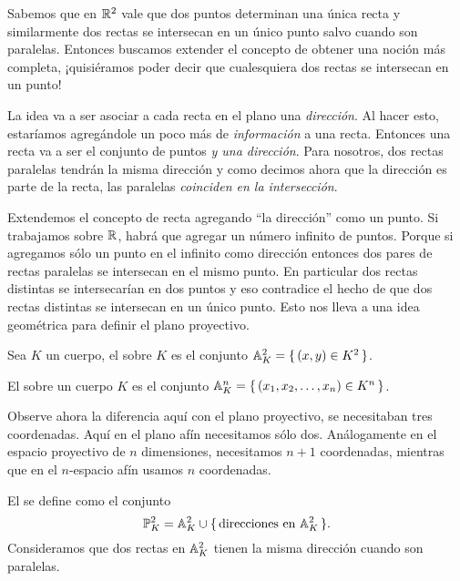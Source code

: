 \documentclass[12pt]{memoir}
\begin{document}
Sabemos que en $\mathbb{R}^2$ vale que dos puntos determinan una única recta y similarmente dos rectas se intersecan en un único punto salvo cuando son paralelas. Entonces buscamos extender el concepto de obtener una noción más completa, ¡quisiéramos poder decir que cualesquiera dos rectas se intersecan en un punto!\par 
La idea va a ser asociar a cada recta en el plano una \emph{dirección}. Al hacer esto, estaríamos agregándole un poco más de \emph{información} a una recta. Entonces una recta va a ser el conjunto de puntos \emph{y una dirección}. Para nosotros, dos rectas paralelas tendrán la misma dirección y como decimos ahora que la dirección es parte de la recta, las paralelas \emph{coinciden en la intersección}.\par 
Extendemos el concepto de recta agregando ``la dirección'' como un punto. Si trabajamos sobre $\mathbb{R}$, habrá que agregar un número infinito de puntos. Porque si agregamos sólo un punto en el infinito como dirección entonces dos pares de rectas paralelas se intersecan en el mismo punto. En particular dos rectas distintas se intersecarían en dos puntos y eso contradice el hecho de que dos rectas distintas se intersecan en un único punto. Esto nos lleva a una idea geométrica para definir el plano proyectivo. 

\begin{Def}
  Sea $K$ un cuerpo, el  sobre $K$ es el conjunto $\mathbb{A}^2_K=\{\,(x,y)\in K^2\,\}$. 
\end{Def}

\begin{Def}
  El  sobre un cuerpo $K$ es el conjunto $\mathbb{A}^n_K=\{\,(x_1,x_2,\dots,x_n)\in K^n\,\}$. 
\end{Def}

Observe ahora la diferencia aquí con el plano proyectivo, se necesitaban tres coordenadas. Aquí en el plano afín necesitamos sólo dos. Análogamente en el espacio proyectivo de $n$ dimensiones, necesitamos $n+1$ coordenadas, mientras que en el $n$-espacio afín usamos $n$ coordenadas.

\begin{Def}
  El  se define como el conjunto 
  $$\mathbb{P}_K^2=\mathbb{A}_K^2\cup\{\,\text{direcciones en }\mathbb{A}_K^2\,\}.$$
  Consideramos que dos rectas en $\mathbb{A}_K^2$ tienen la misma dirección cuando son paralelas.
\end{Def}
\end{document}
